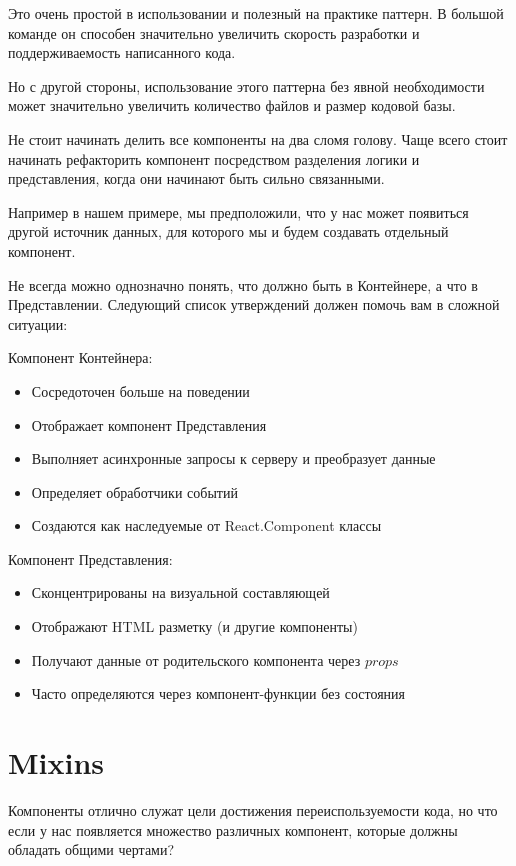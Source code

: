 Это очень простой в использовании и полезный на практике паттерн. В большой команде он способен значительно увеличить скорость разработки и поддерживаемость написанного кода.

Но с другой стороны, использование этого паттерна без явной необходимости может значительно увеличить количество файлов и размер кодовой базы.

Не стоит начинать делить все компоненты на два сломя голову. Чаще всего стоит начинать рефакторить компонент посредством разделения логики и представления, когда они начинают быть сильно связанными. 

Например в нашем примере, мы предположили, что у нас может появиться другой источник данных, для которого мы и будем создавать отдельный компонент.

Не всегда можно однозначно понять, что должно быть в Контейнере, а что в Представлении. Следующий список утверждений должен помочь вам в сложной ситуации:

Компонент Контейнера:

\begin{itemize}
  \item Сосредоточен больше на поведении
  \item Отображает компонент Представления
  \item Выполняет асинхронные запросы к серверу и преобразует данные
  \item Определяет обработчики событий
  \item Создаются как наследуемые от React.Component классы
\end{itemize}


Компонент Представления:

\begin{itemize}
  \item Сконцентрированы на визуальной составляющей 
  \item Отображают HTML разметку (и другие компоненты)
  \item Получают данные от родительского компонента через $props$
  \item Часто определяются через компонент-функции без состояния
\end{itemize}


\section{Mixins}

Компоненты отлично служат цели достижения переиспользуемости кода, но что если у нас появляется множество различных компонент, которые должны обладать общими чертами?

